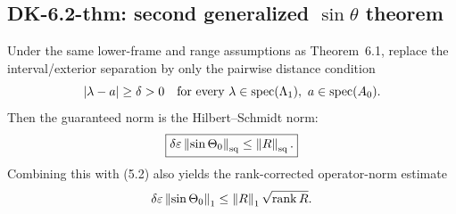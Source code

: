 \subsection*{DK-6.2-thm: second generalized $\sin\theta$ theorem}
Under the same lower-frame and range assumptions as Theorem~6.1, replace the interval/exterior separation by only the pairwise distance condition
\[
 |\lambda-a|\ge\delta>0
 \quad\text{for every }\lambda\in\spec(\Lambda_1),\ a\in\spec(A_0).
\]
Then the guaranteed norm is the Hilbert--Schmidt norm:
\[
 \boxed{\delta\varepsilon\left\lVert \sin\Theta_0\right\rVert_{\mathrm{sq}}
 \le\left\lVert R\right\rVert_{\mathrm{sq}}.}
\]
Combining this with (5.2) also yields the rank-corrected operator-norm estimate
\[
 \delta\varepsilon\left\lVert \sin\Theta_0\right\rVert_1
 \le\left\lVert R\right\rVert_1\sqrt{\operatorname{rank}R}.
\]

